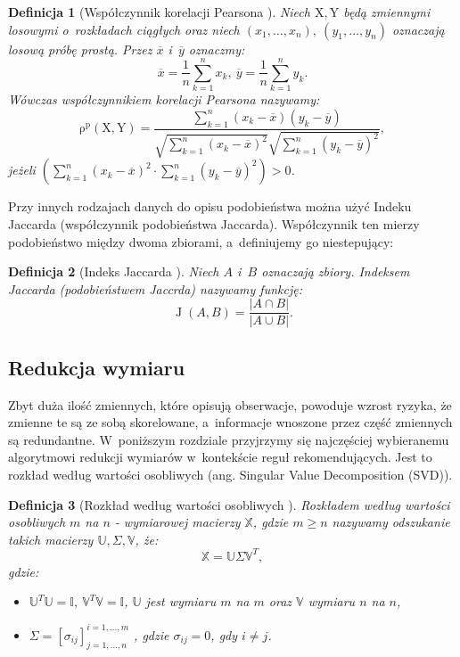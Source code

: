 \documentclass[12pt,a4paper]{report}
\newtheorem{df}{Definicja}[chapter]
\newcommand{\rop}[2]{\operatorname{\rho^p}\left( {#1},{#2} \right)}
\newcommand{\J}[2]{\operatorname{J}\left({#1}, {#2} \right)}
\begin{document}
\begin{df}[Współczynnik korelacji Pearsona \citep{rsh}]

Niech $\mathrm{X},\mathrm{Y}$ będą zmiennymi losowymi o~rozkładach ciągłych oraz niech $(x_1, \ldots, x_n), \: (y_1, \ldots, y_n)$ oznaczają losową próbę prostą. 
Przez $\overline{x}$ i~$\overline{y}$ oznaczmy:
$$
\overline{x}=\frac{1}{n} \sum_{k=1}^n x_k, \: \overline{y}=\frac{1}{n} \sum_{k=1}^n y_k.
$$
Wówczas współczynnikiem korelacji Pearsona nazywamy:
$$
\rop{\mathrm{X}}{\mathrm{Y}} = \frac{\sum_{k=1}^n(x_k - \overline{x})(y_k - \overline{y})}{\sqrt{\sum_{k=1}^n(x_k - \overline{x})^2} \sqrt{\sum_{k=1}^n(y_k - \overline{y})^2 }},
$$
jeżeli $(\sum_{k=1}^n(x_k - \overline{x})^2 \cdot \sum_{k=1}^n(y_k - \overline{y})^2)>0$.
\end{df}

Przy innych rodzajach danych do opisu podobieństwa można użyć Indeku Jaccarda (współczynnik podobieństwa Jaccarda).  Współczynnik ten mierzy podobieństwo między dwoma zbiorami, a~definiujemy go niestepujący:

\begin{df}[Indeks Jaccarda  \citep{bre}]
Niech $\mathit{A}$ i~$\mathit{B}$ oznaczają zbiory. Indeksem Jaccarda (podobieństwem Jaccrda) nazywamy funkcję:
$$
\J{\mathit{A}}{\mathit{B}}=\frac{|\mathit{A}\cap \mathit{B}|}{|\mathit{A} \cup \mathit{B}|}.
$$
\end{df}

\subsection{Redukcja wymiaru}
Zbyt duża ilość zmiennych, które opisują obserwacje, powoduje wzrost ryzyka, że zmienne te są ze sobą skorelowane, a~informacje wnoszone przez część zmiennych są redundantne. W~poniższym rozdziale przyjrzymy się najczęściej wybieranemu algorytmowi redukcji wymiarów w~kontekście reguł rekomendujących. Jest to rozkład według wartości osobliwych (ang. Singular Value Decomposition (SVD)).

\begin{df} [Rozkład według wartości osobliwych {\citep{ulafiir}}]%
Rozkładem według wartości osobliwych $m$ na $n$ - wymiarowej macierzy $\mathbb{X}$, gdzie $m\geq n$ nazywamy odszukanie takich macierzy $\mathbb{U}, \Sigma, \mathbb{V}$, że:
$$
\mathbb{X}=\mathbb{U} \Sigma \mathbb{V}^T,
$$
gdzie:
\begin{itemize}
\item $\mathbb{U}^T \mathbb{U} =\mathbb{I}, \:  \mathbb{V}^T \mathbb{V} = \mathbb{I}$, $\mathbb{U}$ jest wymiaru $m$ na $m$ oraz $\mathbb{V}$ wymiaru $n$ na $n$,
\item $\Sigma = [\sigma_{ij}]_{j = 1, \ldots, n}^{i = 1, \ldots , m}$
, gdzie $\sigma_{ij} = 0$, gdy $i \neq j$.	
\end{itemize}
\end{df}
\end{document}
